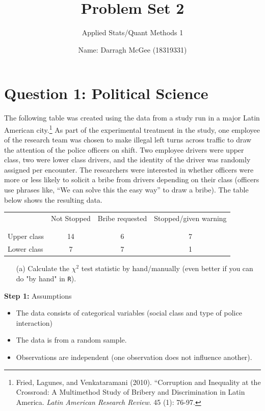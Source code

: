 \documentclass[12pt,letterpaper]{article}
\title{Problem Set 2}
\date{
	Name: Darragh McGee (18319331)\\
}
\author{Applied Stats/Quant Methods 1}
\begin{document}
	\maketitle
	
\vspace{1cm}
	\section*{Question 1: Political Science}
		\vspace{0.5cm}
	The following table was created using the data from a study run in a major Latin American city.\footnote{Fried, Lagunes, and Venkataramani (2010). ``Corruption and Inequality at the Crossroad: A Multimethod Study of Bribery and Discrimination in Latin America. \textit{Latin American Research Review}. 45 (1): 76-97.} As part of the experimental treatment in the study, one employee of the research team was chosen to make illegal left turns across traffic to draw the attention of the police officers on shift. Two employee drivers were upper class, two were lower class drivers, and the identity of the driver was randomly assigned per encounter. The researchers were interested in whether officers were more or less likely to solicit a bribe from drivers depending on their class (officers use phrases like, ``We can solve this the easy way'' to draw a bribe). The table below shows the resulting data.
\vspace{1cm}
\begin{table}[h!]
	\centering
	\begin{tabular}{l | c c c }
		& Not Stopped & Bribe requested & Stopped/given warning \\
		\\[-1.8ex] 
		\hline \\[-1.8ex]
		Upper class & 14 & 6 & 7 \\
		Lower class & 7 & 7 & 1 \\
		\hline
	\end{tabular}
\end{table}

\newpage
\begin{enumerate}
	\item [(a)]
	Calculate the $\chi^2$ test statistic by hand/manually (even better if you can do "by hand" in \texttt{R}).\\
\end{enumerate}
\noindent\textbf{Step 1:} Assumptions
\begin{itemize}
	\item 
	The data consists of categorical variables (social class and type of police interaction)
	\item
	The data is from a random sample. 
	\item 
	Observations are independent (one observation does not influence another).
\end{itemize}
\end{document}
